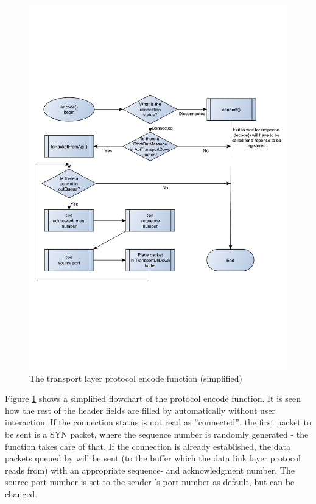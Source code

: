 \begin{figure}[htb]
 \centering
 \includegraphics[scale=0.66,trim=0 207 0 205]{content/graphics/transport/trans_encode_flowchart_simple.pdf}%
 \caption{The transport layer protocol encode function (simplified)}
 \label{fig:trans_encode_flowchart_simple}
\end{figure}

Figure \ref{fig:trans_encode_flowchart_simple} shows a simplified flowchart of the protocol encode function. It is seen how the rest of the header fields are filled by  automatically without user interaction. If the connection status is not read as ''connected'', the first packet to be sent is a SYN packet, where the sequence number is randomly generated - the  function takes care of that. If the connection is already established, the data packets queued by  will be sent (to the  buffer which the data link layer protocol reads from) with an appropriate sequence- and acknowledgment number. The source port number is set to the sender 's port number as default, but can be changed.


